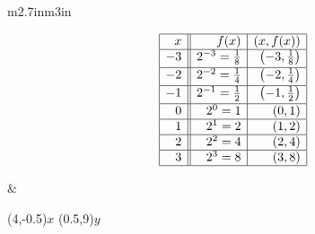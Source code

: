 \hspace{1in} \begin{tabular}{m{2.7in}m{3in}}

\setlength{\extrarowheight}{4pt}
\[ \begin{array}{|r||r|r|}  

\hline

 x & f(x) & (x,f(x)) \\ \hline
-3 & 2^{-3} = \frac{1}{8} & \left(-3, \frac{1}{8} \right) \\ [2pt] \hline
-2 & 2^{-2} = \frac{1}{4} &  \left(-2, \frac{1}{4} \right) \\ [2pt] \hline
-1 & 2^{-1} = \frac{1}{2} &  \left(-1, \frac{1}{2} \right) \\ [2pt]  \hline
0  & 2^{0} = 1 & ( 0 ,1) \\  \hline
1  & 2^{1} = 2 & ( 1, 2) \\  \hline
2  & 2^{2} = 4 & (2,4) \\  \hline
3  & 2^{3} = 8 & (3, 8) \\  \hline
\end{array} \] 
\setlength{\extrarowheight}{2pt}

&

\begin{mfpic}[13]{-4}{4}{-1}{9}
\axes
\tlabel[cc](4,-0.5){\scriptsize $x$}
\tlabel[cc](0.5,9){\scriptsize $y$}
\tlpointsep{4pt}
\arrow \reverse \arrow {}
\end{mfpic} \\

\end{tabular}

